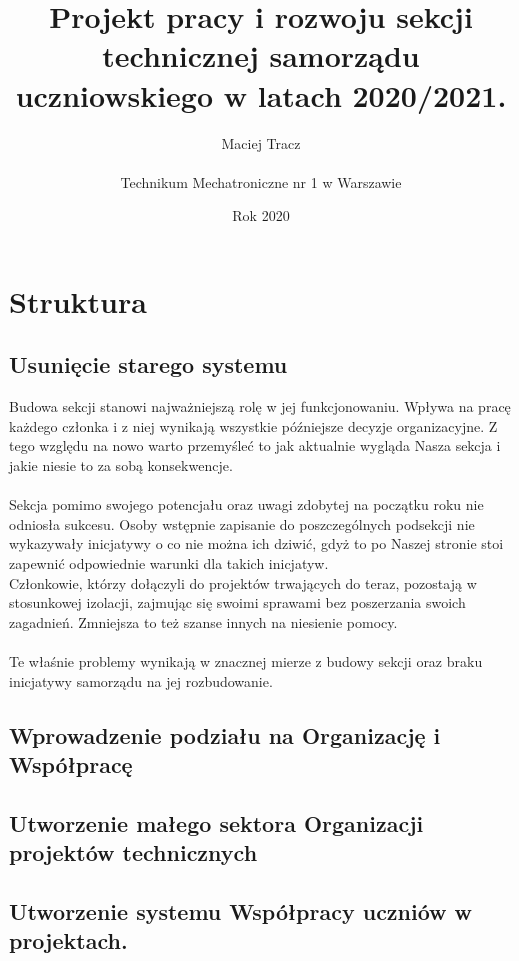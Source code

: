 \documentclass[9pt,a4paper]{report}
\begin{document}
\title{\Huge Projekt pracy i rozwoju sekcji technicznej samorządu uczniowskiego w latach 2020/2021.}
\author{Maciej Tracz \\\\Technikum Mechatroniczne nr 1 w Warszawie}
\date{Rok 2020}
\maketitle

\newpage
\tableofcontents
\newpage

\chapter{Struktura}

\section{Usunięcie starego systemu}
Budowa sekcji stanowi najważniejszą rolę w jej funkcjonowaniu. Wpływa na pracę każdego członka i z niej wynikają wszystkie późniejsze decyzje organizacyjne. Z tego względu na nowo warto przemyśleć to jak aktualnie wygląda Nasza sekcja i jakie niesie to za sobą konsekwencje.\\\\
Sekcja pomimo swojego potencjału oraz uwagi zdobytej na początku roku nie odniosła sukcesu. Osoby wstępnie zapisanie do poszczególnych podsekcji nie wykazywały inicjatywy o co nie można ich dziwić, gdyż to po Naszej stronie stoi zapewnić odpowiednie warunki dla takich inicjatyw.\\Członkowie, którzy dołączyli do projektów trwających do teraz, pozostają w stosunkowej izolacji, zajmując się swoimi sprawami bez poszerzania swoich zagadnień. Zmniejsza to też szanse innych na niesienie pomocy.\\\\
Te właśnie problemy wynikają w znacznej mierze z budowy sekcji oraz braku inicjatywy samorządu na jej rozbudowanie.
\section{Wprowadzenie podziału na Organizację i Współpracę}
\section{Utworzenie małego sektora Organizacji projektów technicznych}
\section{Utworzenie systemu Współpracy uczniów w projektach.}
\end{document}
